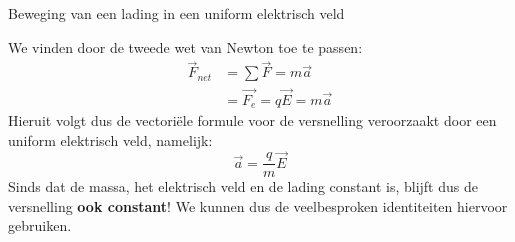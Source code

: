 \begin{app}{Beweging van een lading in een uniform elektrisch veld}
    \begin{minipage}{.7 \textwidth}
        \vspace{-0.15cm}
        We vinden door de tweede wet van Newton toe te passen:
        \begin{align*}
            \Vec{F}_{net} &= \sum \Vec{F} = m\Vec{a} \\
                          &= \Vec{F_e} = q\Vec{E} = m\Vec{a}
        \end{align*}
        \noindent Hieruit volgt dus de vectoriële formule voor de versnelling veroorzaakt door een uniform elektrisch veld, namelijk:
        \begin{equation*}
            \Vec{a} = \dfrac{q}{m}\Vec{E}
        \end{equation*}
        Sinds dat de massa, het elektrisch veld en de lading constant is, blijft dus de versnelling \textbf{ook constant}! We kunnen dus de veelbesproken identiteiten hiervoor gebruiken.
    \end{minipage} 
    \begin{minipage}{.30\textwidth}
        \vspace{-0.3cm}
        \centering

\end{minipage}
\end{app}
